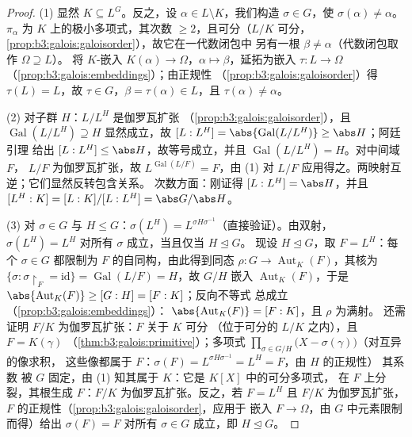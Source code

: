 \begin{proof}
(1) 显然 $K \subseteq L^G$。反之，设 $\alpha \in L
\setminus K$，我们构造 $\sigma \in G$，使 $\sigma(\alpha) \ne
\alpha$。$\pi_\alpha$ 为 $K$ 上的极小多项式，其次数
$\geq 2$，且可分（$L/K$ 可分，
\cref{prop:b3:galois:galoisorder}），故它在一代数闭包中
另有一根 $\beta \neq \alpha$（代数闭包取作 $\Omega \supseteq L$）。
将 $K$-嵌入 $K(\alpha) \to \Omega$，$\alpha \mapsto
\beta$，延拓为嵌入 $\tau\colon L \to \Omega$
（\cref{prop:b3:galois:embeddings}）；由正规性
（\cref{prop:b3:galois:galoisorder}）得 $\tau(L) = L$，故 $\tau \in
G$，$\beta = \tau(\alpha) \in L$，且 $\tau(\alpha) \neq
\alpha$。

(2) 对子群 $H$：$L/L^H$ 是伽罗瓦扩张
（\cref{prop:b3:galois:galoisorder}），且
$\operatorname{Gal}(L/L^H) \supseteq H$ 显然成立，故 $[L:L^H] =
\abs{\operatorname{Gal}(L/L^H)} \geq \abs H$；阿廷引理
给出 $[L:L^H] \leq \abs H$，故等号成立，并且
$\operatorname{Gal}(L/L^H) = H$。对中间域 $F$，
$L/F$ 为伽罗瓦扩张，故 $L^{\operatorname{Gal}(L/F)} = F$，由 (1)
对 $L/F$ 应用得之。两映射互逆；它们显然反转包含关系。
次数方面：刚证得 $[L:L^H] = \abs H$，并且
$[L^H:K] = [L:K]/[L:L^H] = \abs G/\abs H$。

(3) 对 $\sigma \in G$ 与 $H \leq G$：$\sigma(L^H) =
L^{\sigma H\sigma^{-1}}$（直接验证）。由双射，
$\sigma(L^H) = L^H$ 对所有 $\sigma$ 成立，当且仅当 $H \trianglelefteq G$。
现设 $H \trianglelefteq G$，取 $F = L^H$：每个 $\sigma \in
G$ 都限制为 $F$ 的自同构，由此得到同态 $\rho
\colon G \to \operatorname{Aut}_K(F)$，其核为 $\{\sigma :
\sigma\restriction_F = \mathrm{id}\} = \operatorname{Gal}(L/F) =
H$，故 $G/H$ 嵌入 $\operatorname{Aut}_K(F)$，于是
$\abs{\operatorname{Aut}_K(F)} \geq [G:H] = [F:K]$；反向不等式
总成立（\cref{prop:b3:galois:embeddings}）：
$\abs{\operatorname{Aut}_K(F)} = [F:K]$，且 $\rho$ 为满射。
还需证明 $F/K$ 为伽罗瓦扩张：$F$ 关于 $K$ 可分
（位于可分的 $L/K$ 之内），且 $F = K(\gamma)$
（\cref{thm:b3:galois:primitive}）；多项式
$\prod_{\sigma \in G/H}\bigl(X - \sigma(\gamma)\bigr)$（对互异的像求积，
这些像都属于 $F$：$\sigma(F) =
L^{\sigma H\sigma^{-1}} = L^H = F$，由 $H$ 的正规性）
其系数
被 $G$ 固定，由 (1) 知其属于 $K$：它是 $K[X]$ 中的可分多项式，
在 $F$ 上分裂，其根生成 $F$：$F/K$
为伽罗瓦扩张。反之，若 $F = L^H$ 且 $F/K$ 为伽罗瓦扩张，
$F$ 的正规性（\cref{prop:b3:galois:galoisorder}，应用于
嵌入 $F \to \Omega$，由 $G$ 中元素限制而得）给出
$\sigma(F) = F$ 对所有 $\sigma \in G$ 成立，即 $H
\trianglelefteq G$。
\end{proof}

